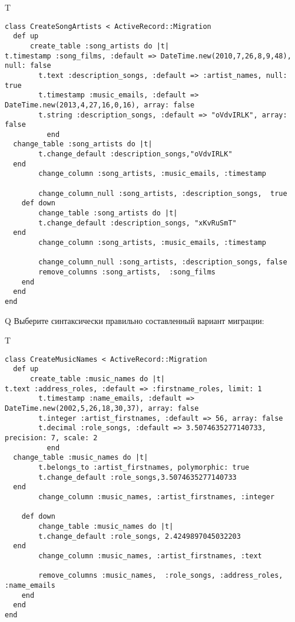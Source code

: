 T
\begin{verbatim}
class CreateSongArtists < ActiveRecord::Migration
  def up
	  create_table :song_artists do |t|
t.timestamp :song_films, :default => DateTime.new(2010,7,26,8,9,48), null: false
		t.text :description_songs, :default => :artist_names, null: true
		t.timestamp :music_emails, :default => DateTime.new(2013,4,27,16,0,16), array: false
		t.string :description_songs, :default => "oVdvIRLK", array: false
		  end
  change_table :song_artists do |t|
		t.change_default :description_songs,"oVdvIRLK"
  end
 		change_column :song_artists, :music_emails, :timestamp
   
		change_column_null :song_artists, :description_songs,  true
	def down
		change_table :song_artists do |t|
		t.change_default :description_songs, "xKvRuSmT"
  end
 		change_column :song_artists, :music_emails, :timestamp
   
		change_column_null :song_artists, :description_songs, false
 		remove_columns :song_artists,  :song_films 
    end 
  end
end

\end{verbatim}

Q
Выберите синтаксически правильно составленный вариант миграции:

T
\begin{verbatim}
class CreateMusicNames < ActiveRecord::Migration
  def up
	  create_table :music_names do |t|
t.text :address_roles, :default => :firstname_roles, limit: 1
		t.timestamp :name_emails, :default => DateTime.new(2002,5,26,18,30,37), array: false
		t.integer :artist_firstnames, :default => 56, array: false
		t.decimal :role_songs, :default => 3.5074635277140733, precision: 7, scale: 2
		  end
  change_table :music_names do |t|
		t.belongs_to :artist_firstnames, polymorphic: true
 		t.change_default :role_songs,3.5074635277140733
  end
 		change_column :music_names, :artist_firstnames, :integer
   
	def down
		change_table :music_names do |t|
		t.change_default :role_songs, 2.4249897045032203
  end
 		change_column :music_names, :artist_firstnames, :text
   
		remove_columns :music_names,  :role_songs, :address_roles, :name_emails 
    end 
  end
end

\end{verbatim}

